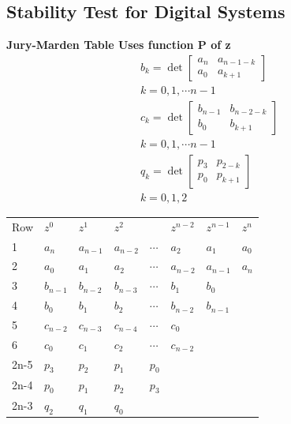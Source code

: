 \subsection{Stability Test for Digital Systems}

\textbf{Jury-Marden Table Uses function P of z} \newline
\begin{align*}
& b_k = \det \begin{bmatrix}
a_n & a_{n-1-k} \\
a_0 & a_{k+1}
\end{bmatrix} \\
& k = 0,1,  \cdots n-1 \\
& c_k = \det \begin{bmatrix}
b_{n-1} & b_{n-2-k} \\
b_0 & b_{k+1}
\end{bmatrix} \\
& k = 0,1,  \cdots n-1 \\
& q_k = \det \begin{bmatrix}
p_{3} & p_{2-k} \\
p_0 & p_{k+1}
\end{bmatrix} \\
& k =0,1,2
\end{align*}

\begin{tabular}{llllllll}
	\cline{1-5}
	Row & $z^0$     & $z^1$     & $z^2$     &          & $z^{n-2}$ & $z^{n-1}$ & $z^n$ \\ %
	1   & $a_n$     & $a_{n-1}$ & $a_{n-2}$ & $\cdots$ & $a_2$     & $a_1$     & $a_0$ \\
	2   & $a_0$     & $a_1$     & $a_2$     & $\cdots$ & $a_{n-2}$ & $a_{n-1}$ & $a_n$ \\
	3   & $b_{n-1}$ & $b_{n-2}$ & $b_{n-3}$ & $\cdots$ & $b_1$     & $b_0$     &       \\ %
	4   & $b_0$     & $b_1$     & $b_2$     & $\cdots$ & $b_{n-2}$ & $b_{n-1}$ &       \\
	5   & $c_{n-2}$ & $c_{n-3}$ & $c_{n-4}$ & $\cdots$ & $c_0$     &           &       \\
	6   & $c_0$     & $c_1$     & $c_2$     & $\cdots$ & $c_{n-2}$ &           &      \\
	2n-5& $p_3$ & $p_2$ & $p_1$ & $p_0$ & & & \\
	2n-4& $p_0$ & $p_1$ & $p_2$ & $p_3$ & & & \\
	2n-3& $q_2$ & $q_1$ & $q_0$ & & & & 
\end{tabular}

